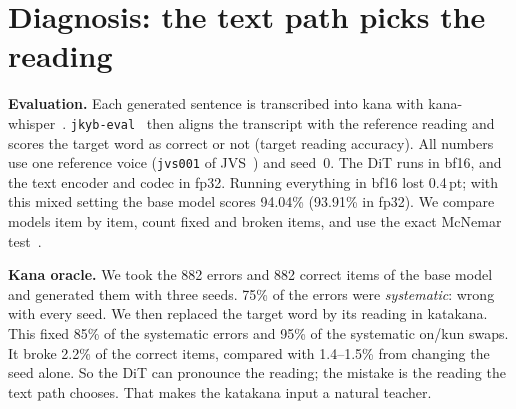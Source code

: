 \documentclass[10pt,a4paper,twocolumn]{article}
\newcommand{\pt}{\,pt}
\begin{document}
\section{Diagnosis: the text path picks the reading}\label{sec:diag}
\textbf{Evaluation.} Each generated sentence is transcribed into kana with
kana-whisper~\cite{kanawhisper,whisper}. \texttt{jkyb-eval}~\cite{jkybp} then aligns the
transcript with the reference reading and scores the target word as correct or not (target
reading accuracy). All numbers use one reference voice (\texttt{jvs001} of
JVS~\cite{jvs}) and seed~0. The DiT runs in bf16, and the text encoder and codec in fp32.
Running everything in bf16 lost 0.4\pt; with this mixed setting the base model scores 94.04\%
(93.91\% in fp32). We compare models item by item, count fixed and broken items, and use the
exact McNemar test~\cite{mcnemar}.

\textbf{Kana oracle.} We took the 882 errors and 882 correct items of the base model and
generated them with three seeds. 75\% of the errors were \emph{systematic}: wrong with every
seed. We then replaced the target word by its reading in katakana. This fixed 85\% of the
systematic errors and 95\% of the systematic on/kun swaps. It broke 2.2\% of the correct items,
compared with 1.4--1.5\% from changing the seed alone. So the DiT can pronounce the reading; the
mistake is the reading the text path chooses. That makes the katakana input a natural teacher.
\end{document}
